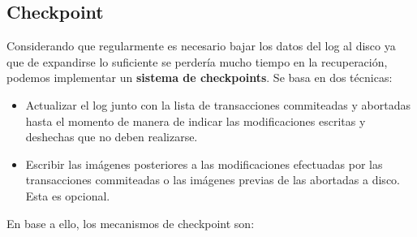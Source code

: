 \subsection*{Checkpoint}
Considerando que regularmente es necesario bajar los datos del log al disco ya que de expandirse lo suficiente se perdería mucho tiempo en la recuperación, podemos implementar un \textbf{sistema de checkpoints}. Se basa en dos técnicas:
\begin{itemize}
    \item Actualizar el log junto con la lista de transacciones commiteadas y abortadas hasta el momento de manera de indicar las modificaciones escritas y deshechas que no deben realizarse.
    \item Escribir las imágenes posteriores a las modificaciones efectuadas por las transacciones commiteadas o las imágenes previas de las abortadas a disco. Esta es opcional.
\end{itemize}
En base a ello, los mecanismos de checkpoint son:
